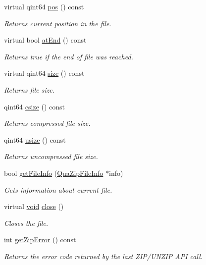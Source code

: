 \begin{DoxyCompactItemize}
virtual qint64 \hyperlink{class_qua_zip_file_a90fd55dab83eca7f95df50b2c41b7f22}{pos} () const 
\begin{DoxyCompactList}\small\item\em Returns current position in the file. \end{DoxyCompactList}\item 
virtual bool \hyperlink{class_qua_zip_file_a1e3f4c3c075da98af426fc167440cfc3}{at\-End} () const 
\begin{DoxyCompactList}\small\item\em Returns {\ttfamily true} if the end of file was reached. \end{DoxyCompactList}\item 
virtual qint64 \hyperlink{class_qua_zip_file_ad1a17cc690a01c3edfb82984c3a4c8f0}{size} () const 
\begin{DoxyCompactList}\small\item\em Returns file size. \end{DoxyCompactList}\item 
qint64 \hyperlink{class_qua_zip_file_ac4da08e5cdec368a2a686775f7dc5639}{csize} () const 
\begin{DoxyCompactList}\small\item\em Returns compressed file size. \end{DoxyCompactList}\item 
qint64 \hyperlink{class_qua_zip_file_a4814b5e6e39fb254737b81ea10964f50}{usize} () const 
\begin{DoxyCompactList}\small\item\em Returns uncompressed file size. \end{DoxyCompactList}\item 
bool \hyperlink{class_qua_zip_file_ad3f5807329321be21b12c1ba5798b359}{get\-File\-Info} (\hyperlink{struct_qua_zip_file_info}{Qua\-Zip\-File\-Info} $\ast$info)
\begin{DoxyCompactList}\small\item\em Gets information about current file. \end{DoxyCompactList}\item 
virtual \hyperlink{group___u_a_v_objects_plugin_ga444cf2ff3f0ecbe028adce838d373f5c}{void} \hyperlink{class_qua_zip_file_a42a39b12619bccd3d419ee60bbb3fcf6}{close} ()
\begin{DoxyCompactList}\small\item\em Closes the file. \end{DoxyCompactList}\item 
\hyperlink{ioapi_8h_a787fa3cf048117ba7123753c1e74fcd6}{int} \hyperlink{class_qua_zip_file_a26d2ee56aad947193b73052f80597ef0}{get\-Zip\-Error} () const 
\begin{DoxyCompactList}\small\item\em Returns the error code returned by the last Z\-I\-P/\-U\-N\-Z\-I\-P A\-P\-I call. \end{DoxyCompactList}\end{DoxyCompactItemize}

